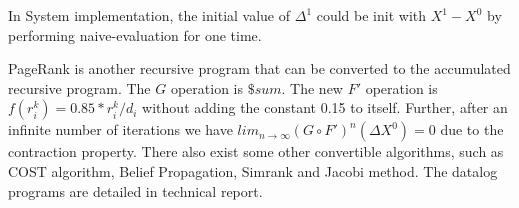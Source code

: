 In System implementation, the initial value of $\Delta^1$ could be init with $X^1-X^0$ by performing naive-evaluation for one time.

PageRank is another recursive program that can be converted to the accumulated recursive program. The $G$ operation is $\$sum$. The new $F'$ operation is $f(r_i^k)=0.85*r_i^k/d_i$ without adding the constant 0.15 to itself. Further, after an infinite number of iterations we have $lim_{n\rightarrow\infty}(G\circ F')^n(\Delta X^0)=0$ due to the contraction property. There also exist some other convertible algorithms, such as COST algorithm, Belief Propagation, Simrank and Jacobi method. The datalog programs are detailed in technical report\cite{fullversion}.

